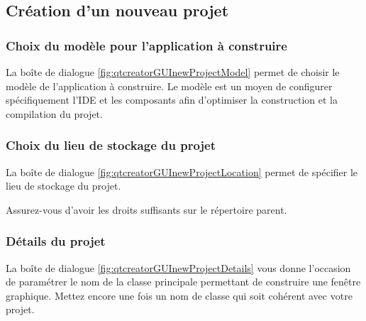 \documentclass[12pt,a4paper,oneside,titlepage,final]{article}
\begin{document}



\subsection{Création d'un nouveau projet}
\label{sec:CreationNewProject}

\subsubsection{Choix du modèle pour l'application à construire}
La boîte de dialogue \figurename
\vref{fig:qtcreatorGUInewProjectModel} permet de choisir le modèle de
l'application à construire. Le modèle est un moyen de configurer
spécifiquement l'\gls{IDE} et les composants afin d'optimiser la
construction et la compilation du projet.


\subsubsection{Choix du lieu de stockage du projet}
La boîte de dialogue \figurename
\vref{fig:qtcreatorGUInewProjectLocation} permet de spécifier le lieu
de stockage du projet.

Assurez-vous d'avoir les droits suffisants sur le répertoire parent.


\subsubsection{Détails du projet}
La boîte de dialogue \figurename
\vref{fig:qtcreatorGUInewProjectDetails} vous donne l'occasion de
paramétrer le nom de la classe principale permettant de construire une
fenêtre graphique. Mettez encore une fois un nom de classe qui soit
cohérent avec votre projet.
\end{document}

